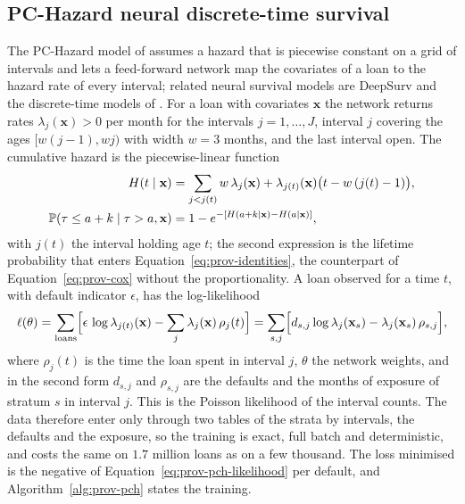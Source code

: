 \subsection{PC-Hazard neural discrete-time survival}
\label{sec:m33}

The PC-Hazard model of \citet{provisions:kvamme2021} assumes a hazard that is piecewise constant on a grid of intervals and lets a feed-forward network map the covariates of a loan to the hazard rate of every interval; related neural survival models are DeepSurv \citep{provisions:katzman2018} and the discrete-time models of
\citet{provisions:kvamme2019}. For a loan with covariates $\mathbf{x}$ the network returns rates $\lambda_j(\mathbf{x})>0$ per month for the intervals $j=1,\dots,J$, interval $j$ covering the ages $[w(j-1),wj)$ with width $w=3$ months, and the last interval open. The cumulative hazard is
the piecewise-linear function
\begin{equation}
\begin{split}
H(t\mid\mathbf{x})&=\sum_{j<j(t)}w\,\lambda_j(\mathbf{x})+\lambda_{j(t)}(\mathbf{x})\bigl(t-w\,(j(t)-1)\bigr),\\
\mathbb{P}(\tau\le a+k\mid\tau>a,\mathbf{x})&=1-e^{-[H(a+k\mid\mathbf{x})-H(a\mid\mathbf{x})]},
\end{split}
\label{eq:prov-pch-hazard}
\end{equation}
with $j(t)$ the interval holding age $t$; the second expression is the lifetime probability that enters Equation~\ref{eq:prov-identities}, the counterpart of Equation~\ref{eq:prov-cox} without the proportionality. A loan observed for a time $t$, with default indicator $\epsilon$, has the log-likelihood
\begin{equation}
\ell(\theta)=\sum_{\text{loans}}\Bigl[\epsilon\,\log\lambda_{j(t)}(\mathbf{x})-\sum_{j}\lambda_j(\mathbf{x})\,\rho_j(t)\Bigr]=\sum_{s,j}\Bigl[d_{s,j}\log\lambda_j(\mathbf{x}_s)-\lambda_j(\mathbf{x}_s)\,\rho_{s,j}\Bigr],
\label{eq:prov-pch-likelihood}
\end{equation}
where $\rho_j(t)$ is the time the loan spent in interval $j$, $\theta$ the network weights, and in the second form $d_{s,j}$ and $\rho_{s,j}$ are the defaults and the months of exposure of stratum $s$ in interval $j$. This is the Poisson likelihood of the interval counts. The data therefore enter only through
two tables of the strata by intervals, the defaults and the exposure, so the training is exact, full batch and deterministic, and costs the same on $1.7$ million loans as on a few thousand. The loss minimised is the negative of Equation~\ref{eq:prov-pch-likelihood} per default, and Algorithm~\ref{alg:prov-pch} states the training.

